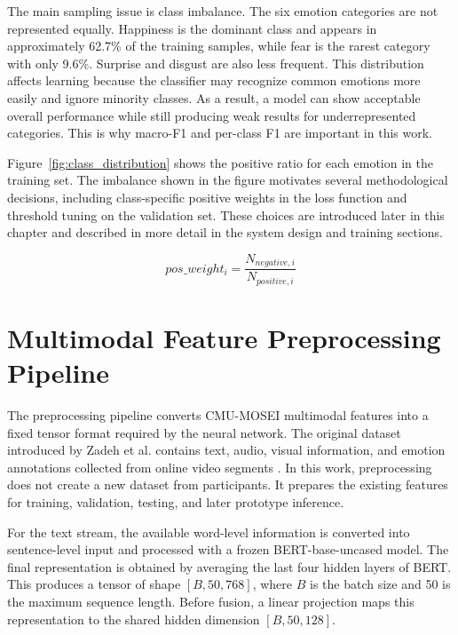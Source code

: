 The main sampling issue is class imbalance. The six emotion categories are not represented equally. Happiness is the dominant class and appears in approximately 62.7\% of the training samples, while fear is the rarest category with only 9.6\%. Surprise and disgust are also less frequent. This distribution affects learning because the classifier may recognize common emotions more easily and ignore minority classes. As a result, a model can show acceptable overall performance while still producing weak results for underrepresented categories. This is why macro-F1 and per-class F1 are important in this work.

Figure~\ref{fig:class_distribution} shows the positive ratio for each emotion in the training set. The imbalance shown in the figure motivates several methodological decisions, including class-specific positive weights in the loss function and threshold tuning on the validation set. These choices are introduced later in this chapter and described in more detail in the system design and training sections.

\begin{equation}
pos\_weight_i = \frac{N_{negative,i}}{N_{positive,i}}
\end{equation}



\section{Multimodal Feature Preprocessing Pipeline}
\label{sec:data_collection}

The preprocessing pipeline converts CMU-MOSEI multimodal features into a fixed tensor format required by the neural network. The original dataset introduced by Zadeh et al. contains text, audio, visual information, and emotion annotations collected from online video segments \cite{zadeh2018multimodal}. In this work, preprocessing does not create a new dataset from participants. It prepares the existing features for training, validation, testing, and later prototype inference.

For the text stream, the available word-level information is converted into sentence-level input and processed with a frozen BERT-base-uncased model. The final representation is obtained by averaging the last four hidden layers of BERT. This produces a tensor of shape $[B, 50, 768]$, where $B$ is the batch size and 50 is the maximum sequence length. Before fusion, a linear projection maps this representation to the shared hidden dimension $[B, 50, 128]$.

